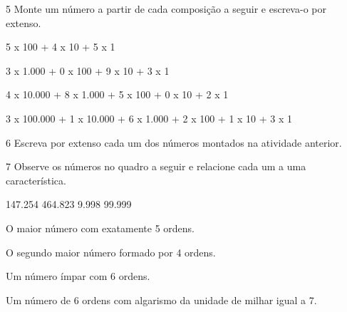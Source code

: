 
\num{5} Monte um número a partir de cada composição a seguir e escreva-o por extenso.

\begin{escolha}
\item 5 x 100 + 4 x 10 + 5 x 1 

\item 3 x 1.000 + 0 x 100 + 9 x 10 + 3 x 1 

\item 4 x 10.000 + 8 x 1.000 + 5 x 100 + 0 x 10 + 2 x 1 

\item 3 x 100.000 + 1 x 10.000 + 6 x 1.000 + 2 x 100 + 1 x 10 + 3 x 1 
\end{escolha}

\num{6} Escreva por extenso cada um dos números montados na atividade anterior.





\pagebreak
\num{7} Observe os números no quadro a seguir e relacione cada um a uma característica.

\begin{mdframed}[linewidth=2pt,linecolor=azul!20,backgroundcolor=azul!20,roundcorner=2pt]
147.254 \hfill 464.823 \hfill 9.998 \hfill 99.999
\end{mdframed}

\begin{escolha}
\item O maior número com exatamente 5 ordens. 

\item O segundo maior número formado por 4 ordens. 

\item Um número ímpar com 6 ordens. 

\item Um número de 6 ordens com algarismo da unidade de milhar igual a 7. 
\end{escolha}

